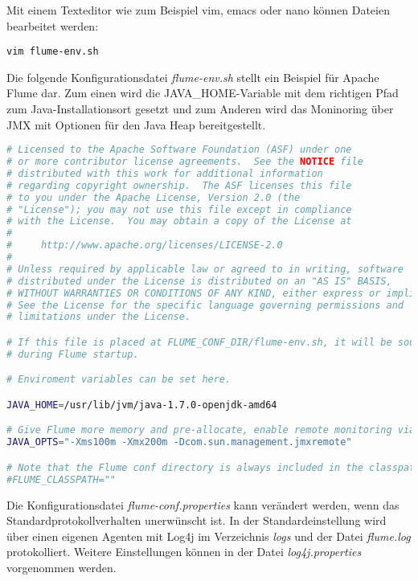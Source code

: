 Mit einem Texteditor wie zum Beispiel vim, emacs oder nano können Dateien bearbeitet werden:
\begin{verbatim}
vim flume-env.sh
\end{verbatim}

Die folgende Konfigurationsdatei \textit{flume-env.sh} stellt ein Beispiel für Apache Flume dar. Zum einen wird die JAVA\_HOME-Variable mit dem richtigen Pfad zum Java-Installationsort gesetzt und zum Anderen wird das Moninoring über JMX mit Optionen für den Java Heap bereitgestellt.

\begin{lstlisting}[language=BASH, label=lst:flumeEnv, caption=Apache Flume Konfiguration]
# Licensed to the Apache Software Foundation (ASF) under one
# or more contributor license agreements.  See the NOTICE file
# distributed with this work for additional information
# regarding copyright ownership.  The ASF licenses this file
# to you under the Apache License, Version 2.0 (the
# "License"); you may not use this file except in compliance
# with the License.  You may obtain a copy of the License at
#
#     http://www.apache.org/licenses/LICENSE-2.0
#
# Unless required by applicable law or agreed to in writing, software
# distributed under the License is distributed on an "AS IS" BASIS,
# WITHOUT WARRANTIES OR CONDITIONS OF ANY KIND, either express or implied.
# See the License for the specific language governing permissions and
# limitations under the License.

# If this file is placed at FLUME_CONF_DIR/flume-env.sh, it will be sourced
# during Flume startup.

# Enviroment variables can be set here.

JAVA_HOME=/usr/lib/jvm/java-1.7.0-openjdk-amd64

# Give Flume more memory and pre-allocate, enable remote monitoring via JMX
JAVA_OPTS="-Xms100m -Xmx200m -Dcom.sun.management.jmxremote"

# Note that the Flume conf directory is always included in the classpath.
#FLUME_CLASSPATH=""
\end{lstlisting}

Die Konfigurationsdatei \textit{flume-conf.properties} kann verändert werden, wenn das Standardprotokollverhalten unerwünscht ist. In der Standardeinstellung wird über einen eigenen Agenten mit Log4j im Verzeichnis \textit{logs} und der Datei \textit{flume.log} protokolliert. Weitere Einstellungen können in der Datei \textit{log4j.properties} vorgenommen werden.

